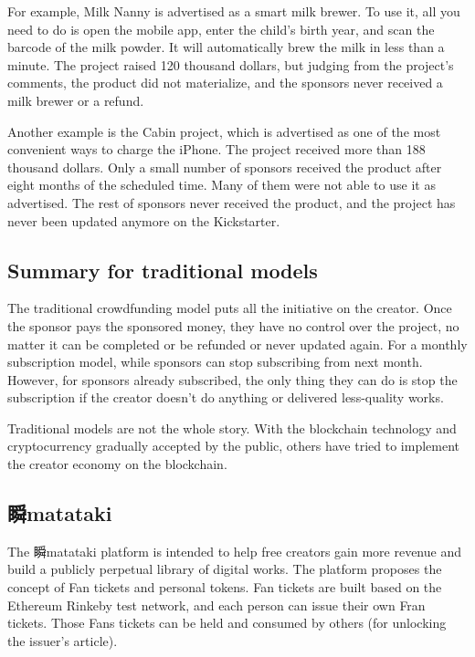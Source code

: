 \documentclass[12pt,a4paper]{article}
\begin{document}
    For example, Milk Nanny\cite{kickstarter_milk_nanny} is advertised as a smart
    milk brewer.
    To use it, all you need to do is open the mobile app, enter the child's birth
    year, and scan the barcode of the milk powder.
    It will automatically brew the milk in less than a minute.
    The project raised 120 thousand dollars, but judging from the project's
    comments, the product did not materialize, and the sponsors never received
    a milk brewer or a refund.

    Another example is the Cabin project\cite{kickstarter_cabin}, which is
    advertised as one of the most convenient ways to charge the iPhone.
    The project received more than 188 thousand dollars.
    Only a small number of sponsors received the product after eight months of
    the scheduled time.
    Many of them were not able to use it as advertised.
    The rest of sponsors never received the product, and the project has never
    been updated anymore on the Kickstarter.

    \subsection{Summary for traditional models}\label{subsec:tradition_summary}

    The traditional crowdfunding model puts all the initiative on the creator.
    Once the sponsor pays the sponsored money, they have no control over the
    project, no matter it can be completed or be refunded or never updated again.
    For a monthly subscription model, while sponsors can stop subscribing from
    next month.
    However, for sponsors already subscribed, the only thing they can do is stop
    the subscription if the creator doesn't do anything or delivered less-quality
    works.

    Traditional models are not the whole story.
    With the blockchain technology and cryptocurrency gradually accepted by the
    public, others have tried to implement the creator economy on the blockchain.

    \subsection{瞬matataki}\label{subsec:blockchain_matataki}

    The 瞬matataki platform is intended to help free creators gain more revenue
    and build a publicly perpetual library of digital works.
    The platform proposes the concept of Fan tickets and personal tokens.
    Fan tickets are built based on the Ethereum Rinkeby test network, and each
    person can issue their own Fran tickets.
    Those Fans tickets can be held and consumed by others (for unlocking the
    issuer's article)\cite{mitataki_fan_ticket}.
\end{document}
